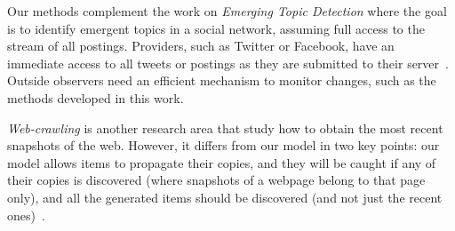 
Our methods complement the work on \emph{Emerging Topic Detection} where the
goal is to identify emergent topics in a social network, assuming full access to
the stream of all postings. Providers, such as Twitter or Facebook, have an
immediate access to all tweets or postings as they are submitted to their
server~\cite{Cataldi2010,Mathioudakis2010}. Outside observers need an efficient
mechanism to monitor changes, such as the methods developed in this work.

\emph{Web-crawling} is another research area that study how to obtain the
most recent snapshots of the web. However, it differs from our model in two key
points: our model allows items to propagate their copies, and they will be
caught if any of their copies is discovered (where snapshots of a webpage belong
to that page only), and all the generated items should be discovered (and not
just the recent ones)~\cite{dasgupta2007discoverability,wolf2002optimal}.

